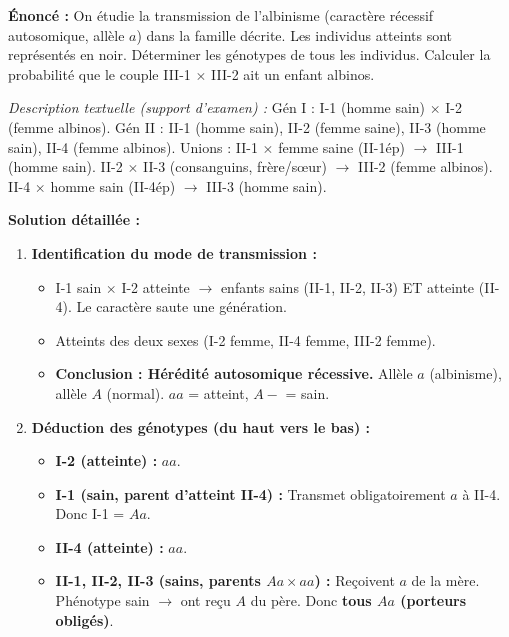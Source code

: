 \documentclass[11pt]{article}
\begin{document}
\begin{exoresolu}
    \textbf{Énoncé :} On étudie la transmission de l'albinisme (caractère récessif autosomique, allèle $a$) dans la famille décrite. Les individus atteints sont représentés en noir. Déterminer les génotypes de tous les individus. Calculer la probabilité que le couple III-1 $\times$ III-2 ait un enfant albinos.
    \begin{center}
        \textit{Description textuelle (support d'examen) :} 
        Gén I : I-1 (homme sain) $\times$ I-2 (femme albinos). 
        Gén II : II-1 (homme sain), II-2 (femme saine), II-3 (homme sain), II-4 (femme albinos). 
        Unions : II-1 $\times$ femme saine (II-1ép) $\rightarrow$ III-1 (homme sain). 
        II-2 $\times$ II-3 (consanguins, frère/sœur) $\rightarrow$ III-2 (femme albinos). 
        II-4 $\times$ homme sain (II-4ép) $\rightarrow$ III-3 (homme sain).
    \end{center}
    \tcblower
    \textbf{Solution détaillée :}
    \begin{enumerate}
        \item \textbf{Identification du mode de transmission :}
              \begin{itemize}
                  \item I-1 sain $\times$ I-2 atteinte $\rightarrow$ enfants sains (II-1, II-2, II-3) ET atteinte (II-4). Le caractère saute une génération.
                  \item Atteints des deux sexes (I-2 femme, II-4 femme, III-2 femme).
                  \item \textbf{Conclusion : Hérédité autosomique récessive.} Allèle $a$ (albinisme), allèle $A$ (normal). $aa$ = atteint, $A-$ = sain.
              \end{itemize}
        \item \textbf{Déduction des génotypes (du haut vers le bas) :}
              \begin{itemize}
                  \item \textbf{I-2 (atteinte) :} \textbf{$aa$}.
                  \item \textbf{I-1 (sain, parent d'atteint II-4) :} Transmet obligatoirement $a$ à II-4. Donc I-1 = \textbf{$Aa$}.
                  \item \textbf{II-4 (atteinte) :} \textbf{$aa$}.
                  \item \textbf{II-1, II-2, II-3 (sains, parents $Aa \times aa$) :} Reçoivent $a$ de la mère. Phénotype sain $\rightarrow$ ont reçu $A$ du père. Donc \textbf{tous $Aa$ (porteurs obligés)}.

\end{itemize}
\end{enumerate}
\end{exoresolu}
\end{document}
